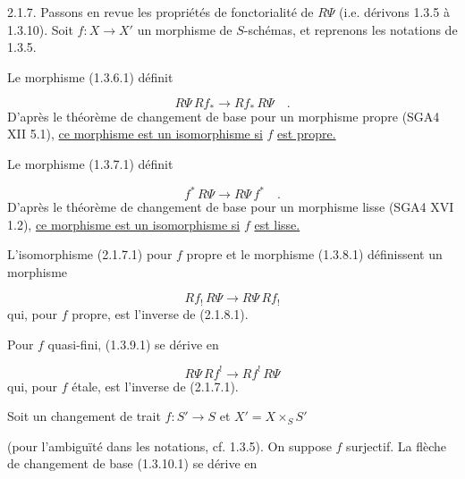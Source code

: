 2.1.7. Passons en revue les propriétés de fonctorialité de $R\Psi$ (i.e. dérivons 1.3.5 à 1.3.10). Soit $f : X \longrightarrow X'$ un morphisme de $S$-schémas, et reprenons les notations de 1.3.5.

Le morphisme (1.3.6.1) définit

\begin{equation}\tag{2.1.7.1}
R\Psi\, Rf_* \longrightarrow Rf_*\, R\Psi \quad .
\end{equation}
D'après le théorème de changement de base pour un morphisme propre (SGA4 XII 5.1), \underline{ce morphisme est un isomorphisme si} $f$ \underline{est propre.}

Le morphisme (1.3.7.1) définit

\begin{equation}\tag{2.1.7.2}
f^*\, R\Psi \longrightarrow R\Psi\, f^* \quad .
\end{equation}
D'après le théorème de changement de base pour un morphisme lisse (SGA4 XVI 1.2), \underline{ce morphisme est un isomorphisme si} $f$ \underline{est lisse.}

L'isomorphisme (2.1.7.1) pour $f$ propre et le morphisme (1.3.8.1)
définissent un morphisme

\begin{equation}\tag{2.1.7.3}
Rf_! \, R\Psi \longrightarrow R\Psi \, Rf_!
\end{equation}
qui, pour $f$ propre, est l'inverse de (2.1.8.1).

Pour $f$ quasi-fini, (1.3.9.1) se dérive en

\begin{equation}\tag{2.1.7.4}
R\Psi \, Rf^! \longrightarrow Rf^! \, R\Psi
\end{equation}
qui, pour $f$ étale, est l'inverse de (2.1.7.1).

Soit un changement de trait $f : S' \longrightarrow S$ et $X' = X \times_S S'$

\begin{center}
\end{center}
(pour l'ambiguïté dans les notations, cf. 1.3.5). On suppose $f$ surjectif. La flèche de changement de base (1.3.10.1) se dérive en

